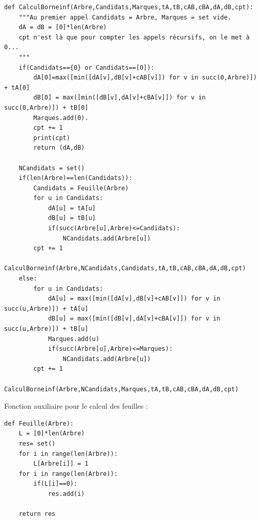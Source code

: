 \documentclass{article}
\begin{document}
\begin{lstlisting}
def CalculBorneinf(Arbre,Candidats,Marques,tA,tB,cAB,cBA,dA,dB,cpt):
    """Au premier appel Candidats = Arbre, Marques = set vide.
    dA = dB = [0]*len(Arbre)
    cpt n'est là que pour compter les appels récursifs, on le met à 0...
    """
    if(Candidats=={0} or Candidats==[0]): 
        dA[0]=max([min([dA[v],dB[v]+cAB[v]]) for v in succ(0,Arbre)]) + tA[0]
        dB[0] = max([min([dB[v],dA[v]+cBA[v]]) for v in succ(0,Arbre)]) + tB[0]
        Marques.add(0).
        cpt += 1
        print(cpt)
        return (dA,dB) 
        
    NCandidats = set()
    if(len(Arbre)==len(Candidats)): 
        Candidats = Feuille(Arbre) 
        for u in Candidats:
            dA[u] = tA[u]
            dB[u] = tB[u]
            if(succ(Arbre[u],Arbre)<=Candidats): 
                NCandidats.add(Arbre[u])
        cpt += 1
        CalculBorneinf(Arbre,NCandidats,Candidats,tA,tB,cAB,cBA,dA,dB,cpt) 
    else: 
        for u in Candidats:
            dA[u] = max([min([dA[v],dB[v]+cAB[v]]) for v in succ(u,Arbre)]) + tA[u]
            dB[u] = max([min([dB[v],dA[v]+cBA[v]]) for v in succ(u,Arbre)]) + tB[u]
            Marques.add(u)          
            if(succ(Arbre[u],Arbre)<=Marques):
                NCandidats.add(Arbre[u])
        cpt += 1
        CalculBorneinf(Arbre,NCandidats,Marques,tA,tB,cAB,cBA,dA,dB,cpt)
\end{lstlisting}

Fonction auxiliaire pour le calcul des feuilles :
\begin{lstlisting}
def Feuille(Arbre):
    L = [0]*len(Arbre)
    res= set()
    for i in range(len(Arbre)):
        L[Arbre[i]] = 1           
    for i in range(len(Arbre)):
        if(L[i]==0):
            res.add(i)
            
    return res
\end{lstlisting}
\end{document}
